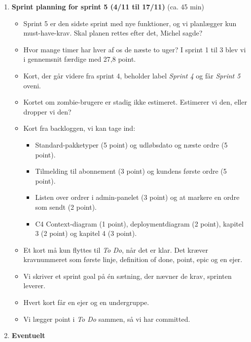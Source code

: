 \documentclass[a4paper,11pt]{article}
\begin{document}
\begin{enumerate}
    \begin{itemize}
        \item Sidst aftalte vi at bruge dependency trees og det fra undervisningen i softwaretest, når vi skriver tests. Gjorde vi det?
        \item Vi aftalte også, at hver person selv flytter sine kort på boardet. Gjorde vi det?
        \item Databasen var lovet til vejledermødet. Nåede vi det, og hvis ikke, hvorfor?
        \item Hvad gik godt?
        \item Hvad gik skidt?
        \item Hvad ændrer vi i sprint 5? Hver ting bliver et kort i Kaneo.
    \end{itemize}
    \item \textbf{Sprint planning for sprint 5 (4/11 til 17/11)} (ca. 45 min)
    \begin{itemize}
        \item Sprint 5 er den sidste sprint med nye funktioner, og vi planlægger kun must-have-krav. Skal planen rettes efter det, Michel sagde?
        \item Hvor mange timer har hver af os de næste to uger? I sprint 1 til 3 blev vi i gennemsnit færdige med 27,8 point.
        \item Kort, der går videre fra sprint 4, beholder label \emph{Sprint 4} og får \emph{Sprint 5} oveni.
        \item Kortet om zombie-brugere er stadig ikke estimeret. Estimerer vi den, eller dropper vi den?
        \item Kort fra backloggen, vi kan tage ind:
        \begin{itemize}
            \item Standard-pakketyper (5 point) og udløbsdato og næste ordre (5 point).
            \item Tilmelding til abonnement (3 point) og kundens første ordre (5 point).
            \item Listen over ordrer i admin-panelet (3 point) og at markere en ordre som sendt (2 point).
            \item C4 Context-diagram (1 point), deploymentdiagram (2 point), kapitel 3 (2 point) og kapitel 4 (3 point).
        \end{itemize}
        \item Et kort må kun flyttes til \emph{To Do}, når det er klar. Det kræver kravnummeret som første linje, definition of done, point, epic og en ejer.
        \item Vi skriver et sprint goal på én sætning, der nævner de krav, sprinten leverer.
        \item Hvert kort får en ejer og en undergruppe.
        \item Vi lægger point i \emph{To Do} sammen, så vi har committed.
    \end{itemize}
    \item \textbf{Eventuelt}
\end{enumerate}
\end{document}
